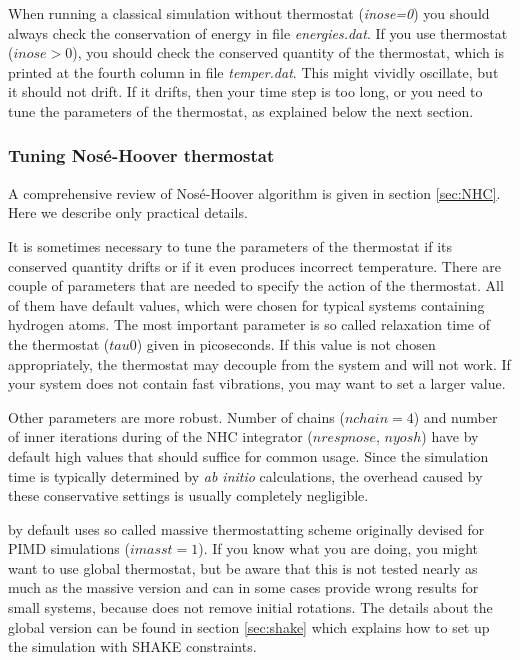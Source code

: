 When running a classical simulation without thermostat (\textit{inose=0}) you should always check the conservation of energy in file \textit{energies.dat}. If you use thermostat ($inose>0$), you should check the conserved quantity of the thermostat, which is printed at the fourth column in file \textit{temper.dat}. This might vividly oscillate, but it should not drift. If it drifts, then your time step is too long, or you need to tune the parameters of the thermostat, as explained below the next section.

\subsubsection{Tuning Nosé-Hoover thermostat} 

A comprehensive review of Nosé-Hoover algorithm is given in section \ref{sec:NHC}. Here we describe only practical details.

It is sometimes necessary to tune the parameters of the thermostat if its conserved quantity drifts or if it even produces incorrect temperature. There are couple of parameters that are needed to specify the action of the thermostat. All of them have default values, which were chosen for typical systems containing hydrogen atoms. The most important parameter is so called relaxation time of the thermostat ($tau0$) given in picoseconds. If this value is not chosen appropriately, the thermostat may decouple from the system and will not work.
If your system does not contain fast vibrations, you may want to set a larger value.  

Other parameters are more robust. Number of chains ($nchain=4$) and number of inner iterations during of the NHC integrator ($nrespnose$, $nyosh$) have by default high values that should suffice for common usage. Since the simulation time is typically determined by \textit{ab initio} calculations, the overhead caused by these conservative settings is usually completely negligible.

\abin by default uses so called massive thermostatting scheme originally devised for PIMD simulations ($imasst=1$).
If you know what you are doing, you might want to use global thermostat, but be aware that this is not tested nearly as much as the massive version and can in some cases provide wrong results for small systems, because \abin does not remove initial rotations. The details about the global version can be found in section \ref{sec:shake} which explains how to set up the simulation with SHAKE constraints.

